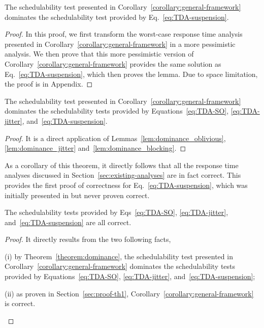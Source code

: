 \begin{Lemma}
  \label{lem:dominance_blocking}
  The schedulability test presented in
  Corollary~\ref{corollary:general-framework} dominates the
  schedulability test provided by Eq.~\eqref{eq:TDA-suspension}.
\end{Lemma}
\begin{proof}
  In this proof, we first transform the worst-case response time analysis presented in Corollary~\ref{corollary:general-framework} in a more pessimistic analysis. We then prove that this more pessimistic version of Corollary~\ref{corollary:general-framework} provides the same solution as Eq.~\eqref{eq:TDA-suspension}, which then proves the lemma. Due to space limitation, the proof is in Appendix\citetechreport{}.
\end{proof}

\begin{theorem}
  \label{theorem:dominance}
  The schedulability test presented in Corollary~\ref{corollary:general-framework} dominates the schedulability tests provided by Equations~\eqref{eq:TDA-SO}, \eqref{eq:TDA-jitter}, and~\eqref{eq:TDA-suspension}.
\end{theorem}
\begin{proof}
It is a direct application of Lemmas~\ref{lem:dominance_oblivious}, \ref{lem:dominance_jitter} and~\ref{lem:dominance_blocking}.
\end{proof}


As a corollary of this theorem, it directly follows that all the response time analyses discussed in Section~\ref{sec:existing-analyses} are in fact correct. This provides the first proof of correctness for Eq.~\eqref{eq:TDA-suspension}, which was initially presented in \cite{Liu:2000:RS:518501} but never proven correct.

\begin{theorem}
  \label{theorem:correctness_soa}
  The schedulability tests provided by Eqs~\eqref{eq:TDA-SO}, \eqref{eq:TDA-jitter}, and~\eqref{eq:TDA-suspension} are all correct.
\end{theorem}
\begin{proof}
It directly results from the two following facts,
\begin{compactitem}
\item[(i)] by Theorem~\ref{theorem:dominance}, the schedulability test presented in Corollary~\ref{corollary:general-framework} dominates the schedulability tests provided by Equations~\eqref{eq:TDA-SO}, \eqref{eq:TDA-jitter}, and~\eqref{eq:TDA-suspension};
\item [(ii)] as proven in Section~\ref{sec:proof-th1}, Corollary~\ref{corollary:general-framework} is correct.
\end{compactitem}
\end{proof}




